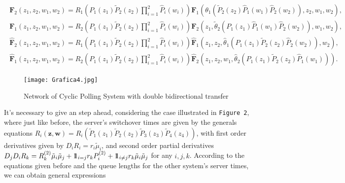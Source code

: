 \documentclass{article}
\newcommand{\indora}{\mbox{$1$\hspace{-0.8ex}$1$}}
\begin{document}
\begin{eqnarray}\label{Recursive.Equations.First.Casse}
\begin{array}{r}
\mathbf{F}_{2}\left(z_{1},z_{2},w_{1},w_{2}\right)=R_{1}\left(P_{1}\left(z_{1}\right)\tilde{P}_{2}
\left(z_{2}\right)\prod_{i=1}^{2}
\hat{P}_{i}\left(w_{i}\right)\right)\mathbf{F}_{1}\left(\theta_{1}\left(\tilde{P}_{2}\left(z_{2}
\right)\hat{P}_{1}\left(w_{1}\right)\hat{P}_{2}\left(w_{2}\right)\right),z_{2},w_{1},w_{2}\right),\\
\mathbf{F}_{1}\left(z_{1},z_{2},w_{1},w_{2}\right)=R_{2}\left(P_{1}\left(z_{1}\right)\tilde{P}_{2}
\left(z_{2}\right)\prod_{i=1}^{2}
\hat{P}_{i}\left(w_{i}\right)\right)\mathbf{F}_{2}\left(z_{1},\tilde{\theta}_{2}\left(P_{1}\left(z_{1}\right)\hat{P}_{1}\left(w_{1}\right)\hat{P}_{2}\left(w_{2}
\right)\right),w_{1},w_{2}\right),\\
\hat{\mathbf{F}}_{2}\left(z_{1},z_{2},w_{1},w_{2}\right)=\hat{R}_{1}\left(P_{1}\left(z_{1}\right)\tilde{P}_{2}\left(z_{2}\right)\prod_{i=1}^{2}
\hat{P}_{i}\left(w_{i}\right)\right)\hat{\mathbf{F}}_{1}\left(z_{1},z_{2},\hat{\theta}_{1}\left(P_{1}\left(z_{1}\right)\tilde{P}_{2}\left(z_{2}\right)\hat{P}_{2}\left(w_{2}
\right)\right),w_{2}\right),\\
\hat{\mathbf{F}}_{1}\left(z_{1},z_{2},w_{1},w_{2}\right)=\hat{R}_{2}\left(P_{1}\left(z_{1}\right)\tilde{P}_{2}\left(z_{2}\right)\prod_{i=1}^{2}
\hat{P}_{i}\left(w_{i}\right)\right)\hat{\mathbf{F}}_{2}\left(z_{1},z_{2},w_{1},\hat{\theta}_{2}\left(P_{1}\left(z_{1}\right)\tilde{P}_{2}\left(z_{2}\right)\hat{P}_{1}\left(w_{1}
\right)\right)\right).
\end{array}
\end{eqnarray}


\begin{figure}[H]\caption{Network of Cyclic Polling System with double bidirectional transfer}
\centering
\texttt{[image: Grafica4.jpg]}
\end{figure}\label{FigureRSVC3}


It's necessary to give an step ahead, considering the case illustrated in \texttt{Figure 2}, where just like before, the server's switchover times are given by the generals equations
$R_{i}\left(\mathbf{z,w}\right)=R_{i}\left(\tilde{P}_{1}\left(z_{1}\right)
\tilde{P}_{2}\left(z_{2}\right)\tilde{P}_{3}\left(z_{3}\right)
\tilde{P}_{4}\left(z_{4}\right)\right)$, with first order derivatives given by $D_{i}R_{i}=r_{i}\tilde{\mu}_{i}$, and second order partial derivatives $D_{j}D_{i}R_{k}=R_{k}^{(2)}\tilde{\mu}_{i}\tilde{\mu}_{j}+\indora_{i=j}r_{k}P_{i}^{(2)}+\indora_{i\neq j}r_{k}\tilde{\mu}_{i}\tilde{\mu}_{j}$ for any $i,j,k$. According to the equations given before and the queue lengths for the other system's server times, we can obtain general expressions
\end{document}
